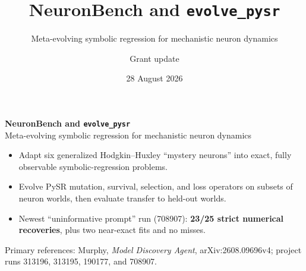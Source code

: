 \documentclass[aspectratio=169,10pt]{beamer}
\title{NeuronBench and \texttt{evolve\_pysr}}
\subtitle{Meta-evolving symbolic regression for mechanistic neuron dynamics}
\author{Grant update}
\date{28 August 2026}
\begin{document}
\begin{frame}[plain]
  \vspace{0.85cm}
  {\color{navy}\LARGE\bfseries NeuronBench and \texttt{evolve\_pysr}}\\[0.30cm]
  {\large Meta-evolving symbolic regression for mechanistic neuron dynamics}\\[0.72cm]

  \begin{minipage}{0.86\textwidth}
  \large
  \begin{itemize}
    \item Adapt six generalized Hodgkin--Huxley ``mystery neurons'' into exact, fully observable symbolic-regression problems.
    \item Evolve PySR mutation, survival, selection, and loss operators on subsets of neuron worlds, then evaluate transfer to held-out worlds.
    \item Newest ``uninformative prompt'' run (708907): \textbf{23/25 strict numerical recoveries}, plus two near-exact fits and no misses.
  \end{itemize}
  \end{minipage}

  \vfill
  {\color{slate}\small Primary references: Murphy, \emph{Model Discovery Agent}, arXiv:2608.09696v4; project runs 313196, 313195, 190177, and 708907.}
\end{frame}
\end{document}
